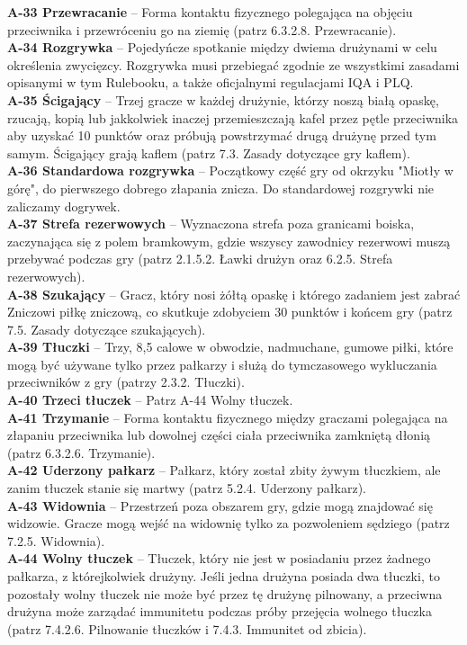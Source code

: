 \documentclass[11pt,a4paper]{article}
\begin{document}
\textbf{A-33 Przewracanie} – Forma kontaktu fizycznego polegająca na objęciu przeciwnika i przewróceniu go na ziemię (patrz 6.3.2.8. Przewracanie).\\
\textbf{A-34 Rozgrywka} – Pojedyńcze spotkanie między dwiema drużynami w celu określenia zwycięzcy. Rozgrywka musi przebiegać zgodnie ze wszystkimi zasadami opisanymi w tym Rulebooku, a także oficjalnymi regulacjami IQA i PLQ.\\
\textbf{A-35 Ścigający} – Trzej gracze w każdej drużynie, którzy noszą białą opaskę, rzucają, kopią lub jakkolwiek inaczej przemieszczają kafel przez pętle przeciwnika aby uzyskać 10 punktów oraz próbują powstrzymać drugą drużynę przed tym samym. Ścigający grają kaflem (patrz 7.3. Zasady dotyczące gry kaflem).\\
\textbf{A-36 Standardowa rozgrywka} – Początkowy część gry od okrzyku "Miotły w górę", do pierwszego dobrego złapania znicza. Do standardowej rozgrywki nie zaliczamy dogrywek.\\
\textbf{A-37 Strefa rezerwowych} – Wyznaczona strefa poza granicami boiska, zaczynająca się z polem bramkowym, gdzie wszyscy zawodnicy rezerwowi muszą przebywać podczas gry (patrz 2.1.5.2. Ławki drużyn oraz 6.2.5. Strefa rezerwowych).\\
\textbf{A-38 Szukający} – Gracz, który nosi żółtą opaskę i którego zadaniem jest zabrać Zniczowi piłkę zniczową, co skutkuje zdobyciem 30 punktów i końcem gry (patrz 7.5. Zasady dotyczące szukających).\\
\textbf{A-39 Tłuczki} – Trzy, 8,5 calowe w obwodzie, nadmuchane, gumowe piłki, które mogą być używane tylko przez pałkarzy i służą do tymczasowego wykluczania przeciwników z gry (patrzy 2.3.2. Tłuczki).\\
\textbf{A-40 Trzeci tłuczek} – Patrz A-44 Wolny tłuczek.\\
\textbf{A-41 Trzymanie} – Forma kontaktu fizycznego między graczami polegająca na złapaniu przeciwnika lub dowolnej części ciała przeciwnika zamkniętą dłonią (patrz 6.3.2.6. Trzymanie).\\
\textbf{A-42 Uderzony pałkarz} – Pałkarz, który został zbity żywym tłuczkiem, ale zanim tłuczek stanie się martwy (patrz 5.2.4. Uderzony pałkarz).\\
\textbf{A-43 Widownia} – Przestrzeń poza obszarem gry, gdzie mogą znajdować się widzowie. Gracze mogą wejść na widownię tylko za pozwoleniem sędziego (patrz 7.2.5. Widownia).\\
\textbf{A-44 Wolny tłuczek} – Tłuczek, który nie jest w posiadaniu przez żadnego pałkarza, z którejkolwiek drużyny. Jeśli jedna drużyna posiada dwa tłuczki, to pozostały wolny tłuczek nie może być przez tę drużynę pilnowany, a przeciwna drużyna może zarządać immunitetu podczas próby przejęcia wolnego tłuczka (patrz 7.4.2.6. Pilnowanie tłuczków i 7.4.3. Immunitet od zbicia).\\
\end{document}
